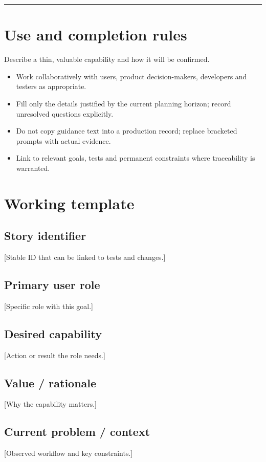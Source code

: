 \documentclass[11pt,letterpaper]{article}
\begin{document}
\tableofcontents\medskip\noindent\rule{\linewidth}{0.4pt}\medskip
\section{Use and completion rules}
Describe a thin, valuable capability and how it will be confirmed.

\begin{itemize}[leftmargin=*,itemsep=2pt]
\item Work collaboratively with users, product decision-makers, developers and testers as appropriate.
\item Fill only the details justified by the current planning horizon; record unresolved questions explicitly.
\item Do not copy guidance text into a production record; replace bracketed prompts with actual evidence.
\item Link to relevant goals, tests and permanent constraints where traceability is warranted.
\end{itemize}
\section{Working template}
\subsection{Story identifier}
[Stable ID that can be linked to tests and changes.]

\subsection{Primary user role}
[Specific role with this goal.]

\subsection{Desired capability}
[Action or result the role needs.]

\subsection{Value / rationale}
[Why the capability matters.]

\subsection{Current problem / context}
[Observed workflow and key constraints.]
\end{document}
